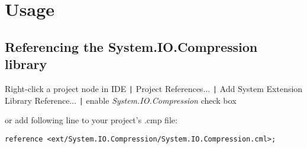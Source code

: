 \chapter{Usage}

\section{Referencing the System.IO.Compression library}

Right-click a project node in IDE \verb.|. Project References... \verb.|.
Add System Extension Library Reference... \verb.|.
enable \emph{System.IO.Compression} check box

\begin{flushleft}
or add following line to your project's .cmp file:
\begin{verbatim}
reference <ext/System.IO.Compression/System.IO.Compression.cml>;
\end{verbatim}
\end{flushleft}
